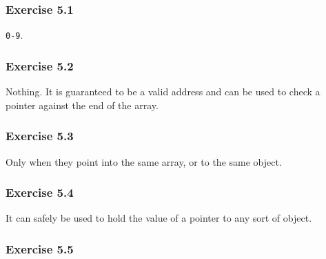   

  \subsubsection*{Exercise 5.1}

   \texttt{0-9}.


  

  \subsubsection*{Exercise 5.2}

   Nothing. It is guaranteed to be a valid address and can be used to check
    a pointer against the end of the array.


  

  \subsubsection*{Exercise 5.3}

   Only when they point into the same array, or to the same object.


  

  \subsubsection*{Exercise 5.4}

   It can safely be used to hold the value of a pointer to any sort of
    object.


  

  \subsubsection*{Exercise 5.5}


